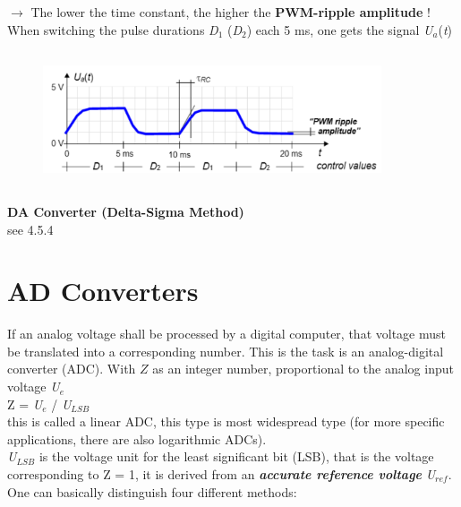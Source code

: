 $\rightarrow$ The lower the time constant, the higher the \textbf{PWM-ripple amplitude} ! \\

When switching the pulse durations \textit{D}${}_{1}$ (\textit{D}${}_{2}$) each 5 ms, one gets the signal \textit{U${}_{a}$}(\textit{t})\\

    \begin{figure}[h]
    \centering
    \includegraphics[width=10cm, height=4cm]{Images/image173.png}
    \label{fig:Fig }
    \end{figure}

{\rot\bf 	DA Converter (Delta-Sigma Method)}\\

see 4.5.4

\newpage
\section{ AD Converters }

If an analog voltage shall be processed by a digital computer, that voltage must be translated into a corresponding number. This is the task is an analog-digital converter (ADC). With \textit{$Z$} as an integer number, proportional to the analog input voltage \textit{U}${}_{e}$\\

Z\textit{ }= \textit{U${}_{e}$} / \textit{U}${}_{LSB}$\\

this is called a linear ADC, this type is most widespread type (for more specific applications, there are also logarithmic ADCs).\\

\textit{U${}_{LSB}$} is the voltage unit for the least significant bit (LSB), that is the voltage corresponding to $\mathrm{Z}$ = 1, it is derived from an \textbf{\textit{accurate reference voltage}} \textit{U${}_{ref}$}.\\

One can basically distinguish four different methods:

